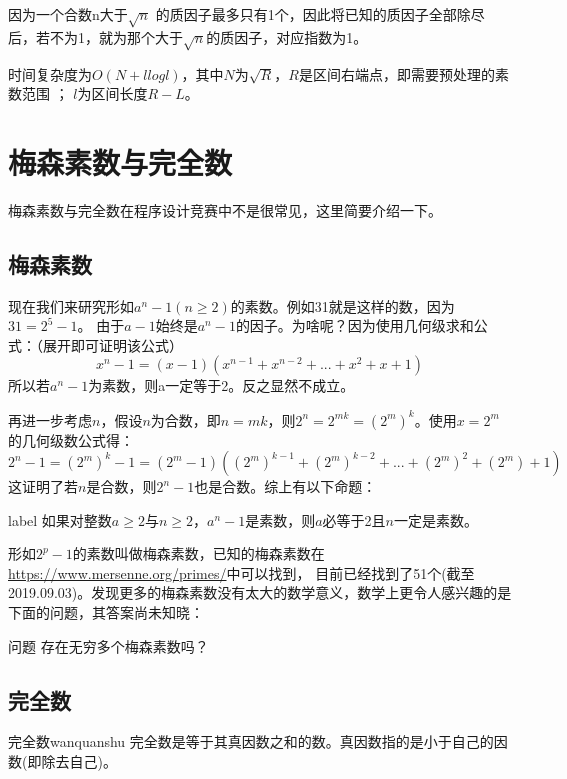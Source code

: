 因为一个合数n大于$\sqrt{n}$ 的质因子最多只有1个，因此将已知的质因子全部除尽后，若不为1，就为那个大于$\sqrt{n}$的质因子，对应指数为1。

时间复杂度为$O(N + llogl)$，其中$N$为$\sqrt{R}$，$R$是区间右端点，即需要预处理的素数范围 ； $l$为区间长度$R-L$。




\section{梅森素数与完全数}
梅森素数与完全数在程序设计竞赛中不是很常见，这里简要介绍一下。

\subsection{梅森素数}
现在我们来研究形如$a^n-1(n\ge2)$的素数。例如31就是这样的数，因为$31 = 2^5 - 1$。
由于$a-1$始终是$a^n-1$的因子。为啥呢？因为使用几何级求和公式：（展开即可证明该公式）
$$
x^n-1=(x-1)(x^{n-1}+x^{n-2}+...+x^2+x+1)
$$
所以若$a^n-1$为素数，则a一定等于2。反之显然不成立。

再进一步考虑$n$，假设$n$为合数，即$n=mk$，则$2^n=2^{mk}=(2^m)^k$。使用$x=2^m$的几何级数公式得：
$$
2^n - 1 = (2^m)^k - 1 = (2^m-1)((2^m)^{k-1}+(2^m)^{k-2}+...+(2^m)^2+(2^m)+1)
$$
这证明了若$n$是合数，则$2^n-1$也是合数。综上有以下命题：

\begin{proposition}{}{label}
	如果对整数$a\ge2$与$n\ge2$，$a^n-1$是素数，则$a$必等于2且$n$一定是素数。
\end{proposition}

形如$2^p-1$的素数叫做{\heiti 梅森素数}，已知的梅森素数在\href{https://www.mersenne.org/primes/}{https://www.mersenne.org/primes/}中可以找到，
目前已经找到了51个(截至2019.09.03)。发现更多的梅森素数没有太大的数学意义，数学上更令人感兴趣的是下面的问题，其答案尚未知晓：

\begin{custom}{问题}
	存在无穷多个梅森素数吗？
\end{custom}

\subsection{完全数}

\begin{definition}{完全数}{wanquanshu}
	完全数是等于其真因数之和的数。真因数指的是小于自己的因数(即除去自己)。
\end{definition}



